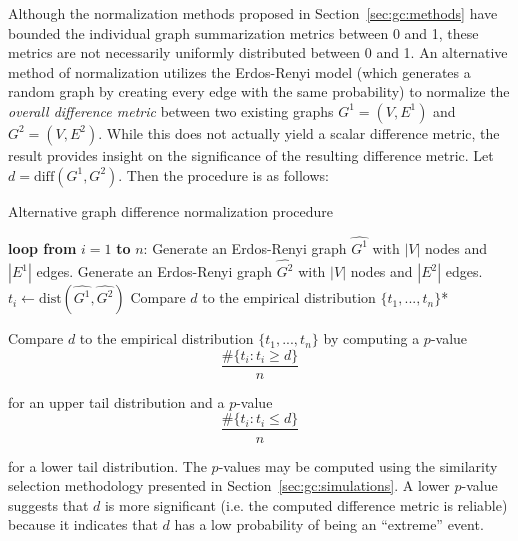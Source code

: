 Although the normalization methods proposed in Section~\ref{sec:gc:methods} 
have bounded the individual graph summarization metrics between 0 and 1, these 
metrics are not necessarily uniformly distributed between 0 and 1. An 
alternative method of normalization utilizes the Erdos-Renyi model (which 
generates a random graph by creating every edge with the same probability) to 
normalize the \textit{overall difference metric} between 
two existing graphs $G^1=(V,E^1)$ and $G^2=(V,E^2)$. While this does not 
actually yield a scalar difference metric, the result provides insight on 
the significance of the resulting difference metric.
Let $d = \text{diff}(G^1,G^2)$. Then the procedure is as follows:

\tablespacing
\begin{algorithm}[H]
	\caption{Alternative graph difference 
	normalization procedure}\label{alg:gc:simulations:extension}
	\begin{algorithmic}[1]
		\State \textbf{loop from} $i=1$ \textbf{to} $n$:
		\State \indent Generate an Erdos-Renyi graph $\hat{G^1}$ with 
		$|V|$ nodes and $|E^1|$ edges.
		\State \indent Generate an Erdos-Renyi graph $\hat{G^2}$ with 
		$|V|$ nodes and $|E^2|$ edges.
		\State \indent $t_i \gets \text{dist}(\hat{G^1},\hat{G^2})$
		\State Compare $d$ to the empirical distribution $\{t_1,...,t_n\}$*
		\EndProcedure
	\end{algorithmic}
\end{algorithm}
\bodyspacing
 
\noindent *Compare $d$ to the empirical distribution $\{t_1,...,t_n\}$ by 
computing a $p$-value
$$\frac{\#\{t_i : t_i\geq d \}}{n}$$

\noindent for an upper tail distribution and a $p$-value
$$\frac{\#\{t_i : t_i \leq d \}}{n}$$

\noindent for a lower tail distribution. The $p$-values may be computed using 
the similarity selection methodology 
presented in Section~\ref{sec:gc:simulations}. A lower $p$-value 
suggests that $d$ is more significant (i.e. the computed difference metric is 
reliable) because it indicates that $d$ has a low probability of being an 
``extreme'' event.